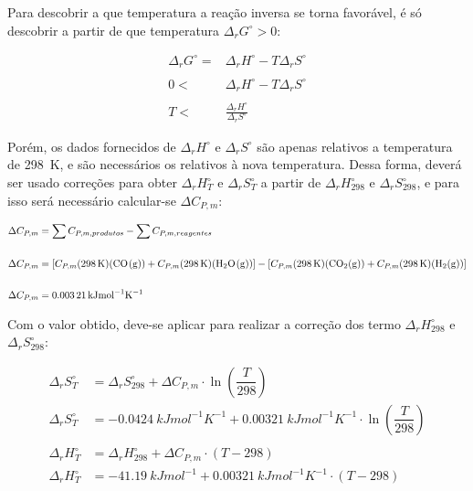 Para descobrir a que temperatura a reação inversa se torna favorável, é só descobrir a partir de que temperatura \(\Delta_rG^\circ > 0\):

\begin{align*}
	\Delta_rG^\circ = &\Delta_rH^\circ - T \Delta_rS^\circ \\ \\
	0 < &\Delta_rH^\circ - T \Delta_rS^\circ \\ \\
	T < &\frac{\Delta_rH^\circ}{\Delta_rS^\circ}
\end{align*}

Porém, os dados fornecidos de \(\Delta_rH^\circ\)  e  \(\Delta_rS^\circ\) são apenas relativos a temperatura de \qty{298}{K}, e são necessários os relativos à nova temperatura. Dessa forma, deverá ser usado correções para obter \(\Delta_rH^\circ_{T}\) e \(\Delta_rS^\circ_{T}\)  a partir de \(\Delta_rH^\circ_{298}\) e \(\Delta_rS^\circ_{298} \), e para isso será necessário calcular-se \(\Delta C_{P,m}\):

 \begin{align*}
 	\Delta C_{P,m} &= \sum C_{P,m, produtos} - \sum C_{P,m, reagentes}\\ \\
 	\Delta C_{P,m} &= [C_{P,m} (\qty{298}{K}) (\ce{CO(g)}) + C_{P,m}
    (\qty{298}{K}) (\ce{H2O(g)})] - [ C_{P,m} (\qty{298}{K}) (\ce{CO2(g)}) +
    C_{P,m} (\qty{298}{K}) (\ce{H2(g)})]\\ \\
 	\Delta C_{P,m} &= \qty{0,00321}{kJmol^{-1}K^{-1}}
 \end{align*}
 
Com o valor obtido, deve-se aplicar para realizar a correção dos termo \(\Delta_rH^\circ_{298}\) e \(\Delta_rS^\circ_{298} \):

\begin{align*}
	\Delta_rS^\circ_{T} &= \Delta_rS^\circ_{298} +\Delta C_{P,m} \cdot \ln (\dfrac{T}{298}) \\
	\Delta_rS^\circ_{T} &= \qty{-0,0424}{kJmol^{-1}K^{-1}}
    +\qty{0,00321}{kJmol^{-1}K^{-1}} \cdot \ln (\dfrac{T}{298}) \\ \\
	\Delta_rH^\circ_{T} &= \Delta_rH^\circ_{298} +\Delta C_{P,m} \cdot (T - 298) \\
	\Delta_rH^\circ_{T} &= \qty{-41,19}{kJmol^{-1}}
    +\qty{0,00321}{kJmol^{-1}K^{-1}} \cdot (T - 298) \\
\end{align*}

